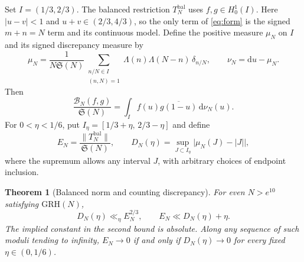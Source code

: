 \documentclass[11pt,a4paper]{article}
\numberwithin{equation}{section}
\newtheorem{theorem}{Theorem}[section]
\newcommand{\SSS}{\mathfrak S}
\newcommand{\grh}{\mathrm{GRH}}
\newcommand{\ud}{\mathrm d}
\newcommand{\B}{\mathcal B_N}
\newcommand{\Tbal}{T_N^{\mathrm{bal}}}
\begin{document}
Set $I=(1/3,2/3)$. The balanced restriction $\Tbal$ uses $f,g\in H^1_0(I)$.
Here $|u-v|<1$ and $u+v\in(2/3,4/3)$, so the only term of
\cref{eq:form} is the signed $m+n=N$ term and its continuous model. Define the
positive measure $\mu_N$ on $I$ and its signed discrepancy measure by
\begin{equation}
  \mu_N=\frac1{N\SSS(N)}
    \sum_{\substack{n/N\in I\\(n,N)=1}}
       \Lambda(n)\Lambda(N-n)\,\delta_{n/N},
  \qquad
  \nu_N=\ud u-\mu_N.
  \label{eq:nu}
\end{equation}
Then
\begin{equation}
  \frac{\B(f,g)}{\SSS(N)}
    =\int_I f(u)\overline{g(1-u)}\,\ud\nu_N(u).
  \label{eq:balance}
\end{equation}
For $0<\eta<1/6$, put $I_\eta=[1/3+\eta,\,2/3-\eta]$ and define
\begin{equation}
  E_N=\frac{\|\Tbal\|}{\SSS(N)},\qquad
  D_N(\eta)=\sup_{J\subset I_\eta}
     \bigl|\mu_N(J)-|J|\bigr|,
  \label{eq:discrepancy}
\end{equation}
where the supremum allows any interval $J$, with arbitrary choices
of endpoint inclusion.

\begin{theorem}[Balanced norm and counting discrepancy]
\label{thm:disc}
For even $N>e^{10}$ satisfying $\grh(N)$,
\begin{equation}
  D_N(\eta)\ll_\eta E_N^{2/3},\qquad
  E_N\ll D_N(\eta)+\eta .
  \label{eq:equiv}
\end{equation}
The implied constant in the second bound is absolute. Along any sequence
of such moduli tending to infinity, $E_N\to0$ if and only if
$D_N(\eta)\to0$ for every fixed $\eta\in(0,1/6)$.
\end{theorem}
\end{document}
